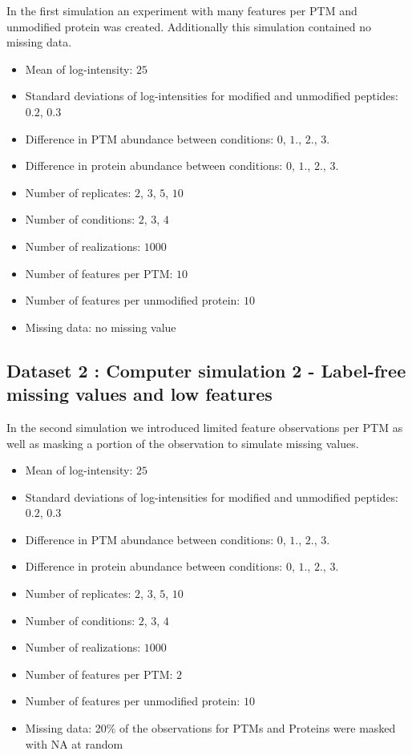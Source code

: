 \documentclass{mcp}
\begin{document}
In the first simulation an experiment with many features per PTM and unmodified protein was created. Additionally this simulation contained no missing data.

\begin{itemize}
\item Mean of log-intensity: $25$
\item Standard deviations of log-intensities for modified and unmodified peptides: $0.2$, $0.3$
\item Difference in PTM abundance between conditions: $0$, $1.$, $2.$, $3.$
\item Difference in protein abundance between conditions: $0$, $1.$, $2.$, $3.$
\item Number of replicates: $2$, $3$, $5$, $10$
\item Number of conditions: $2$, $3$, $4$
\item Number of realizations: $1000$
\item Number of features per PTM: $10$
\item Number of features per unmodified protein: $10$
\item Missing data: no missing value
\end{itemize}

\subsection{Dataset 2 : Computer simulation 2 - Label-free missing values and low features}
\label{sec:dataset2}

In the second simulation we introduced limited feature observations per PTM as well as masking a portion of the observation to simulate missing values.

\begin{itemize}
\item Mean of log-intensity: $25$
\item Standard deviations of log-intensities for modified and unmodified peptides: $0.2$, $0.3$
\item Difference in PTM abundance between conditions: $0$, $1.$, $2.$, $3.$
\item Difference in protein abundance between conditions: $0$, $1.$, $2.$, $3.$
\item Number of replicates: $2$, $3$, $5$, $10$
\item Number of conditions: $2$, $3$, $4$
\item Number of realizations: $1000$
\item Number of features per PTM: $2$
\item Number of features per unmodified protein: $10$
\item Missing data: 20\% of the observations for PTMs and Proteins were masked with NA at random
\end{itemize}
\end{document}
